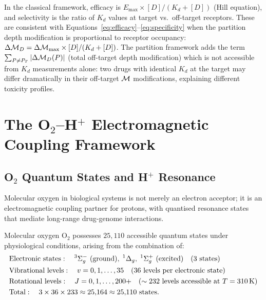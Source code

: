 \begin{remark}
In the classical framework, efficacy is $E_{\max} \times [D] / (K_d + [D])$
(Hill equation), and selectivity is the ratio of $K_d$ values at target vs.\
off-target receptors. These are consistent with Equations~\eqref{eq:efficacy}--\eqref{eq:specificity}
when the partition depth modification is proportional to receptor occupancy:
$\Delta\mathcal{M}_D = \Delta\mathcal{M}_{\max} \times [D]/(K_d + [D])$.
The partition framework adds the term $\sum_{P \neq P_T}|\Delta\mathcal{M}_D(P)|$
(total off-target depth modification) which is not accessible from $K_d$
measurements alone: two drugs with identical $K_d$ at the target may differ
dramatically in their off-target $\mathcal{M}$ modifications, explaining different
toxicity profiles.
\end{remark}

\section{The O$_2$--H$^+$ Electromagnetic Coupling Framework}
\label{sec:o2_h_coupling}

\subsection{O$_2$ Quantum States and H$^+$ Resonance}

Molecular oxygen in biological systems is not merely an electron acceptor; it
is an electromagnetic coupling partner for protons, with quantised resonance
states that mediate long-range drug-genome interactions.

\begin{proposition}
\label{prop:o2_states}
Molecular oxygen O$_2$ possesses $25{,}110$ accessible quantum states under
physiological conditions, arising from the combination of:
\begin{align}
  &\text{Electronic states}: \quad
  {}^3\Sigma_g^- \text{ (ground)},\; {}^1\Delta_g,\; {}^1\Sigma_g^+ \text{ (excited)} \quad (3 \text{ states}) \notag \\
  &\text{Vibrational levels}: \quad v = 0, 1, \ldots, 35 \quad (36 \text{ levels per electronic state}) \notag \\
  &\text{Rotational levels}: \quad J = 0, 1, \ldots, 200\text{+} \quad (\sim 232 \text{ levels accessible at } T = 310\,\mathrm{K}) \notag \\
  &\text{Total}: \quad 3 \times 36 \times 233 \approx 25{,}164 \approx 25{,}110 \text{ states.} \notag
\end{align}
\end{proposition}

